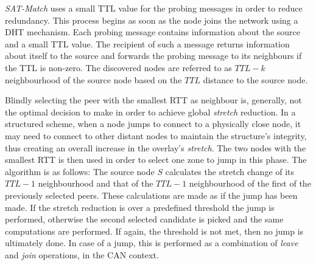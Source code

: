 \documentclass[acmcsur]{acmtrans2m}
\begin{document}
\emph{SAT-Match} uses a small TTL value for the probing messages in order to
reduce redundancy\cite{jiang_lightflood_2008}. This process begins as soon as
the node joins the network using a DHT mechanism. Each probing message contains
information about the source and a small TTL value. The recipient of such a
message returns information about itself to the source and forwards the probing
message to its neighbours if the TTL is non-zero. The discovered nodes are
referred to as $TTL-k$ neighbourhood of the source node based on the $TTL$ distance
to the source node. 

Blindly selecting the peer with the smallest RTT as neighbour is, generally, not
the optimal decision to make in order to achieve global \emph{stretch} reduction.
In a structured scheme, when a node jumps to connect to a
physically close node, it may need to connect to other distant nodes to maintain
the structure's integrity, thus creating an overall increase in the overlay's
\emph{stretch}. The two nodes with the smallest RTT is then used in order to
select one zone to jump in this phase. The algorithm is as follows: The source
node $S$ calculates the stretch change of its $TTL-1$ neighbourhood and that of
the $TTL-1$ neighbourhood of the first of the previously selected peers. These
calculations are made as if the jump has been made. If the stretch reduction is
over a predefined threshold the jump is performed, otherwise the second selected
candidate is picked and the same computations are performed. If again, the
threshold is not met, then no jump is ultimately done. In case of a jump, this
is performed as a combination of \emph{leave} and \emph{join} operations, in the
CAN context.
\end{document}
